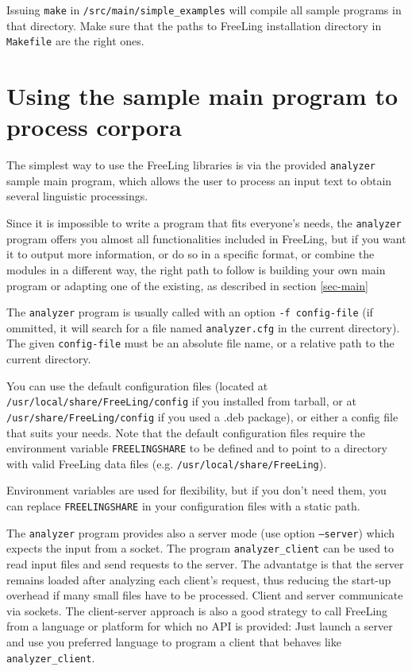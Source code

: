 \documentclass[a4paper]{book}
\begin{document}
 Issuing {\tt make} in {\tt /src/main/simple\_examples} will compile 
 all sample programs in that directory. Make sure that the paths to 
 FreeLing installation directory in {\tt Makefile} are the right ones.




\chapter{Using the sample main program to process corpora}
\label{cap-analyzer}

 The simplest way to use the FreeLing libraries is via the provided
 {\tt analyzer} sample main program, which allows the user to
 process an input text to obtain several linguistic processings.

  Since it is impossible to write a program that fits
  everyone's needs, the {\tt analyzer} program offers you almost all
  functionalities included in FreeLing, but if you want it to output
  more information, or do so in a specific format, or combine the
  modules in a different way, the right path to follow is building
  your own main program or adapting one of the existing, as described
  in section \ref{sec-main}

  The {\tt analyzer} program is usually called 
  with an option \verb#-f config-file#  (if ommitted, it will search
  for a file named {\tt analyzer.cfg} in the current directory).
  The given \verb#config-file# must be an absolute file name, or a 
  relative path to the current directory.

  You can use the default configuration files (located 
  at {\tt /usr/local/share/FreeLing/config} if you installed from tarball, 
  or at {\tt /usr/share/FreeLing/config} if you used a .deb package), or 
  either a config file that suits your needs. 
   Note that the default configuration
  files require the environment variable {\tt FREELINGSHARE} to be
  defined and to point to a directory with valid FreeLing data files
  (e.g. {\tt /usr/local/share/FreeLing}). 

   Environment variables are used for flexibility, but if you don't need
  them, you can replace {\tt FREELINGSHARE} in your configuration files
  with a static path.

  The {\tt analyzer} program provides also a server mode (use option
  {\tt --server}) which expects the input from a socket.  The program
  {\tt analyzer\_client} can be used to read input files and send
  requests to the server. The advantatge is that the server remains
  loaded after analyzing each client's request, thus reducing the
  start-up overhead if many small files have to be processed. Client
  and server communicate via sockets.  The client-server approach is
  also a good strategy to call FreeLing from a language or platform
  for which no API is provided: Just launch a server and use you preferred 
  language to program a client that behaves like \verb#analyzer_client#. 
\end{document}
